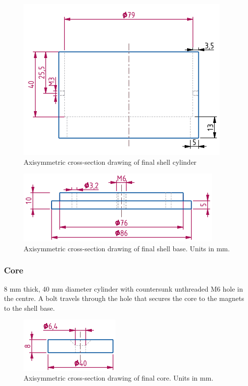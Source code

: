 \documentclass[a4paper,12pt]{article}
\begin{document}
\begin{figure}[h!] 
	\centering
	\includegraphics[scale=0.5]{shellcylinder.png}
	\caption{Axisymmetric cross-section drawing of final shell cylinder}
	\label{fg:shellcylinder}
\end{figure}

\begin{figure}[h!] 
	\centering
	\includegraphics[scale=0.5]{shellbase.png}
	\caption{Axisymmetric cross-section drawing of final shell base. Units in mm.}
	\label{fg:shellbase}
\end{figure}

\subsubsection{Core}
8 mm thick, 40 mm diameter cylinder with countersunk unthreaded M6 hole in the centre. A bolt travels through the hole that secures the core to the magnets to the shell base. 

\begin{figure}[h!] 
	\centering
	\includegraphics[scale=0.5]{core.png}
	\caption{Axisymmetric cross-section drawing of final core. Units in mm.}
	\label{fg:core}
\end{figure}
\end{document}
